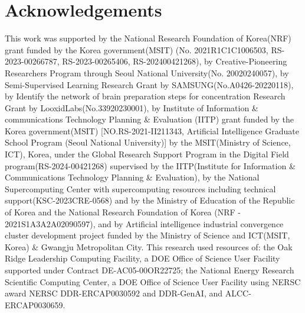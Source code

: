 \documentclass[runningheads,a4paper]{llncs}
\begin{document}
\section*{Acknowledgements}
\label{sec:acknowledgements}
{%
This work was supported by the National Research Foundation of Korea(NRF) grant funded by the Korea government(MSIT) (No. 2021R1C1C1006503, RS-2023-00266787, RS-2023-00265406, RS-202400421268), by Creative-Pioneering Researchers Program through Seoul National University(No. 20020240057), by Semi-Supervised Learning Research Grant by SAMSUNG(No.A0426-20220118), by Identify the network of brain preparation steps for concentration Research Grant by LooxidLabs(No.33920230001), by Institute of Information \& communications Technology Planning \& Evaluation (IITP) grant funded by the Korea government(MSIT) [NO.RS-2021-II211343, Artificial Intelligence Graduate School Program (Seoul National University)] by the MSIT(Ministry of Science, ICT), Korea, under the Global Research Support Program in the Digital Field program(RS-2024-00421268) supervised by the IITP(Institute for Information \& Communications Technology Planning \& Evaluation), by the National Supercomputing Center with supercomputing resources including technical support(KSC-2023CRE-0568) and by the Ministry of Education of the Republic of Korea and the National Research Foundation of Korea (NRF - 2021S1A3A2A02090597), and by Artificial intelligence industrial convergence cluster development project funded by the Ministry of Science and ICT(MSIT, Korea) \& Gwangju Metropolitan City. This research used resources of: the Oak Ridge Leadership Computing Facility, a DOE Office of Science User Facility supported under Contract DE-AC05-00OR22725; the National Energy Research Scientific Computing Center, a DOE Office of Science User Facility using NERSC award NERSC DDR-ERCAP0030592 and DDR-GenAI, and ALCC-ERCAP0030659.
}
\end{document}

